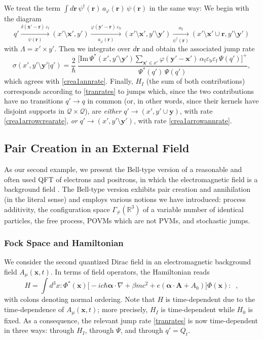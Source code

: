\documentclass[12pt]{article}
\newcommand{\RRR}{\mathbb{R}} %
\newcommand{\I}{i} %
\newcommand{\1}{\mathbf{1}} %
\renewcommand{\Im}{\mathrm{Im}} %
\newcommand{\conf}{\mathcal{Q}} %
\newcommand{\profile}{\varphi}
\newcommand{\Gommo}{\Gamma_{\!\neq}} %
\newcommand{\vx}{{\boldsymbol x}} %
\newcommand{\vy}{{\boldsymbol y}}
\newcommand{\vr}{{\boldsymbol r}}
\newcommand{\inter}{{I}} %
\newcommand{\fer}{{\mathrm{f}}} %
\newcommand{\bos}{{\mathrm{b}}} %
\begin{document}
We treat the term $\int d\vr \, \psi^\dag(\vr) \, a_\profile(\vr) \,
\psi(\vr)$ in the same way: We begin with the diagram
\[
   q' \xrightarrow[\psi(\vr)]{\delta(\vx'-\vr) \, \varepsilon_\fer} (x'
   \setminus \vx', y') \xrightarrow[a_\profile(\vr)]{\profile(\vy'
   -\vr) \, \varepsilon_\bos} (x' \setminus \vx',y' \setminus \vy')
   \xrightarrow[\psi^\dag(\vr)] {\alpha_\fer} (x' \setminus \vx' \cup
   \vr,y' \setminus \vy')
\]
with $\Lambda = x' \times y'$. Then we integrate over $d\vr$ and
obtain the associated jump rate
\begin{equation}\label{crea1arrowannrate}
   \sigma(x',y' \setminus \vy'|q') = \frac{2}{\hbar} \, \frac{\Big[\Im
   \, \Psi^*(x',y' \setminus \vy') \sum\limits_{\vx' \in x'}
   \profile(\vy' -\vx') \, \alpha_\fer \varepsilon_\bos \varepsilon_\fer 
\,
   \Psi(q')\Big]^+} {\Psi^*(q') \, \Psi(q')},
\end{equation}
which agrees with \eqref{crea1annrate}.  Finally, $H_\inter$ (the sum of
both contributions) corresponds according to \eqref{tranrates} to jumps
which, since the two contributions have no transitions $q' \to q$ in
common
(or, in other words, since their kernels have disjoint supports in 
$\conf
\times \conf$), are \emph{either} $q' \to (x',y' \cup \vy)$, with rate
\eqref{crea1arrowcrearate}, \emph{or} $q' \to (x',y' \setminus \vy')$,
with
rate \eqref{crea1arrowannrate}.




\subsection{Pair Creation in an External Field}
\label{sec:positron}

As our second example, we present the Bell-type version of a
reasonable and often used QFT of electrons and positrons, in which the
electromagnetic field is a background field \cite{Ruijsenaars}.  The
Bell-type version exhibits pair creation and annihilation (in the
literal sense) and employs various notions we have introduced: process
additivity, the configuration space $\Gommo(\RRR^3)$ of a variable
number of identical particles, the free process, POVMs which are not
PVMs, and stochastic jumps.


\subsubsection{Fock Space and Hamiltonian}\label{sec:posiFock}

We consider the second quantized Dirac field in an electromagnetic
background field $A_\mu(\vx,t)$. In terms of field operators, the
Hamiltonian reads
\begin{equation}\label{fieldhamil}
   H= \int d^3 x :{\Phi^*}(\vx)\big[-\I c\hbar \boldsymbol{\alpha} \cdot
   \nabla +\beta m c^2+ e(\boldsymbol{\alpha}\cdot\boldsymbol{A} +
   A_0) \big]\Phi(\vx):\;\;,
\end{equation}
with colons denoting normal ordering. Note that $H$ is time-dependent
due to the time-dependence of $A_\mu(\vx,t)$; more precisely,
$H_\inter$ is time-dependent while $H_0$ is fixed. As a consequence,
the relevant jump rate \eqref{tranrates} is now time-dependent in
three ways: through $H_\inter$, through $\Psi$, and through $q' =
Q_t$.
\end{document}
